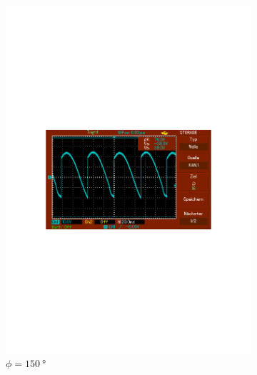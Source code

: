 \begin{figure}
\begin{subfigure}{0.3\textwidth}
      \includegraphics[width=\textwidth]{Daten/noNoise/150.pdf}
      \caption{$\phi = \SI{150}{\degree}$}
      \label{fig:150}
  \end{subfigure}
  \par\medskip %
  \begin{subfigure}{0.3\textwidth}
      \centering

\end{subfigure}
\end{figure}
